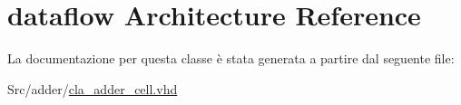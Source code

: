 \hypertarget{classcla__adder__cell_1_1dataflow}{\section{dataflow Architecture Reference}
\label{classcla__adder__cell_1_1dataflow}
}


La documentazione per questa classe è stata generata a partire dal seguente file\+:\begin{DoxyCompactItemize}
\item 
Src/adder/\hyperlink{cla__adder__cell_8vhd}{cla\+\_\+adder\+\_\+cell.\+vhd}\end{DoxyCompactItemize}
